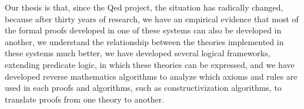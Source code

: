 Our thesis is that, since the
Qed project, the situation has radically changed, because after
thirty years of research, we have an empirical evidence that most of
the formal proofs developed in one of these systems can also be
developed in another, we understand the relationship between the
theories implemented in these systems much better, we have developed
several logical frameworks, extending predicate logic, in which these
theories can be expressed, and we have developed reverse mathematics
algorithms to analyze which axioms and rules are used in each proofs
and algorithms, such as constructivization algorithms, to translate
proofs from one theory to another.


